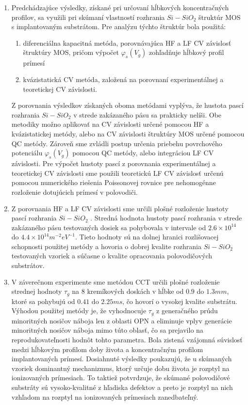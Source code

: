 \begin{enumerate}
\item Predchádzajúce výsledky, získané pri určovaní hĺbkových
  koncentračných profilov, sa využili pri skúmaní vlastností rozhrania
  $Si-SiO_{2}$ štruktúr MOS s implantovaným substrátom. Pre analýzu
  týchto štruktúr bola použitá:
\begin{enumerate}
\item diferenciálna kapacitná metóda, porovnávajúca HF a LF CV
  závislosť štruktúry MOS, pričom výpočet $\varphi_{s}(V_{g})$
  zohľadňuje hĺbkový profil prímesí
\item kvázistatická CV metóda, založená na porovnaní experimentálnej a
  teoretickej CV závislosti.
\end{enumerate}
Z porovnania výsledkov získaných oboma metódami vyplýva, že hustota
pascí rozhrania $Si-SiO_{2}$ v strede zakázaného pásu sa prakticky
nelíši. Obe metodiky možno aplikovať na CV závislosti určené pomocou
HF a kvázistatickej metódy, alebo na CV závislosti štruktúry MOS
určené pomocou QC metódy. Zároveň sme zvládli postup určenia priebehu
povrchového potenciálu $\varphi_s(V_g)$ pomocou QC metódy, alebo
integráciou LF CV závislosti. Pre výpočet hustoty pascí z porovnania
experimentálnej a teoretickej CV závislosti sme použili teoretickú LF
CV závislosť určenú pomocou numerického riešenia Poissonovej rovnice
pre nehomogénne rozloženie dotujúcich prímesí v polovodiči.

\item Z porovnania HF a LF CV závislosti sme určili plošné rozloženie
  hustoty pascí rozhrania $Si-SiO_{2}$ . Stredná hodnota hustoty pascí
  rozhrania v strede zakázaného pásu testovaných dosiek sa pohybovala
  v intervale od $2.6 \times 10^{14}$ do $4.4 \times 10^{14}
  m^{-2}eV^{-1}$. Tieto hodnoty sú na dolnej hranici rozlišovacej
  schopnosti použitej metódy a hovoria o dobrej kvalite rozhrania
  $Si-SiO_{2}$ testovaných vzoriek a súčasne o kvalite opracovania
  polovodičových substrátov.

\item V záverečnom experimente sme metódou CCT určili plošné
  rozloženie strednej hodnoty $\tau_{g}$ na 8 kremíkových doskách v
  hĺbke od $0.9$ do $1.3 mm$, ktoré sa pohybujú od $0.41$ do $2.25
  ms$, čo hovorí o vysokej kvalite substrátu. \newline Výhodou
  použitej metódy je, že vyhodnocuje $\tau_{g}$ z generačného prúdu
  minoritných nosičov náboja len z oblasti OPN a eliminuje vplyv
  generácie minoritných nosičov náboja mimo túto oblasť, čo sa
  prejavilo na reprodukovateľnosti hodnôt tohto parametra. \newline
  Bola zistená vzájomná súvislosť medzi hĺbkovým profilom doby života
  a koncentračným profilom implantovaných prímesí.  Dosiahnuté
  výsledky poukazujú, že u skúmaných vzoriek dominantný mechanizmus,
  ktorý určuje dobu života je rozptyl na ionizovaných prímesiach. To
  taktiež potvrdzuje, že skúmané polovodičové substráty sú
  vysoko-kvalitné z hľadiska defektov a preto je rozptyl na nich
  vzhľadom na rozptyl na ionizovaných prímesiach zanedbateľný.


\end{enumerate}
